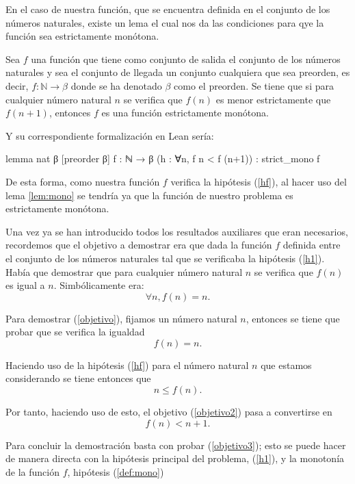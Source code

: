 \begin{demostracion}
  En el caso de nuestra función, que se encuentra definida en el conjunto
  de los números naturales, existe un lema el cual nos da las condiciones
  para qye la función sea estrictamente monótona.

  \begin{lema}\label{lem:mono}
    Sea \(f\) una función que tiene como conjunto de salida el conjunto
    de los números naturales y sea el conjunto de llegada un conjunto
    cualquiera que sea preorden, es decir, \(f:ℕ → β\) donde se ha
    denotado \(β\) como el preorden. Se tiene que si para cualquier
    número natural \(n\) se verifica que \(f(n)\) es menor estrictamente
    que \(f(n+1)\), entonces \(f\) es una función estrictamente monótona.
  \end{lema}

  Y su correspondiente formalización en Lean sería:
  \begin{leancode}
    lemma nat {β} [preorder β] {f : ℕ → β} (h : ∀n, f n < f (n+1)) :
    strict_mono f
  \end{leancode}

  De esta forma, como nuestra función \(f\) verifica la hipótesis
  (\ref{hf}), al hacer uso del lema \ref{lem:mono} se tendría ya que la
  función de nuestro problema es estrictamente monótona.

  Una vez ya se han introducido todos los resultados auxiliares que eran
  necesarios, recordemos que el objetivo a demostrar era que dada la
  función \(f\) definida entre el conjunto de los números naturales tal
  que se verificaba la hipótesis (\ref{h1}). Había que demostrar que
  para cualquier número natural \(n\) se verifica que \(f(n)\) es igual
  a \(n\). Simbólicamente era:
  \begin{equation}\label{objetivo}
    ∀n, f(n)=n.
  \end{equation}

  Para demostrar (\ref{objetivo}), fijamos un número natural \(n\),
  entonces se tiene que probar que se verifica la igualdad
  \begin{equation}\label{objetivo2}
    f(n)=n.
  \end{equation}

  Haciendo uso de la hipótesis (\ref{hf}) para el número natural \(n\) que
  estamos considerando se tiene entonces que
  \begin{equation}
    n≤f(n).
  \end{equation}

  Por tanto, haciendo uso de esto, el objetivo (\ref{objetivo2}) pasa a
  convertirse en
  \begin{equation}\label{objetivo3}
    f(n)<n+1.
  \end{equation}

  Para concluir la demostración basta con probar (\ref{objetivo3}); esto se
  puede hacer de manera directa con la hipótesis principal del problema,
  (\ref{h1}), y la monotonía de la función \(f\), hipótesis (\ref{def:mono})
\end{demostracion}

